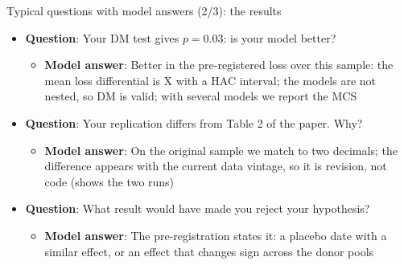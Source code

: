 \begin{frame}{Typical questions with model answers (2/3): the results}
\itemsize{\footnotesize}
\begin{itemize}
    \item \textbf{Question}: Your DM test gives $p = 0.03$: is your model better?
    \begin{itemize}
        \item \textbf{Model answer}: Better in the pre-registered loss over this sample: the mean loss differential is X with a HAC interval; the models are not nested, so DM is valid; with several models we report the MCS
    \end{itemize}
    \item \textbf{Question}: Your replication differs from Table 2 of the paper. Why?
    \begin{itemize}
        \item \textbf{Model answer}: On the original sample we match to two decimals; the difference appears with the current data vintage, so it is revision, not code (shows the two runs)
    \end{itemize}
    \item \textbf{Question}: What result would have made you reject your hypothesis?
    \begin{itemize}
        \item \textbf{Model answer}: The pre-registration states it: a placebo date with a similar effect, or an effect that changes sign across the donor pools
    \end{itemize}
\end{itemize}
\end{frame}

